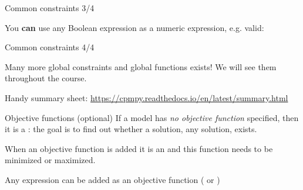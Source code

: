 \documentclass{cons-beamer}
\begin{document}
\begin{flashcardcpmpy}
\begin{frame}{Common constraints 3/4}
  \begin{example}
    \vspace{-0.5em}
    
    \vspace{-0.5em}
  \end{example}
  You \textbf{can} use any Boolean expression as a numeric expression, e.g. valid: 
\end{frame}

\begin{frame}{Common constraints 4/4}
  \begin{example}
    \vspace{-0.5em}
    
    \vspace{-0.5em}
  \end{example}
  Many more global constraints and global functions exists! We will see them throughout the course.

  \vspace{1em}
  \begin{footnotesize}
    Handy summary sheet: \url{https://cpmpy.readthedocs.io/en/latest/summary.html}

  \end{footnotesize}

\end{frame} 

\begin{frame}{Objective functions (optional)}
  If a model has \textit{no objective function} specified, then it is a : the goal is to find out whether a solution, any solution, exists. 

  When an objective function is added it is an  and this function needs to be minimized or maximized.

  \begin{example}
    \vspace{-0.5em}
    
  \end{example}
  Any expression can be added as an objective function ( or )


\end{frame}
\end{flashcardcpmpy}
\end{document}
